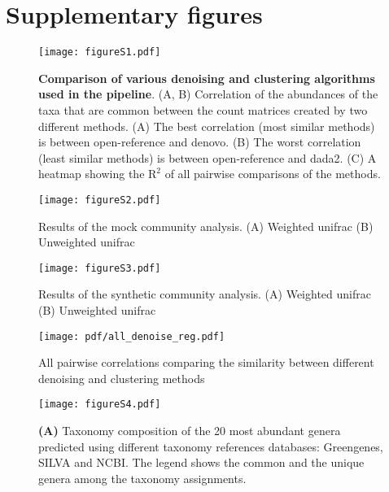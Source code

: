 
\newpage
\section*{Supplementary figures}

  \renewcommand{\thefigure}{S\arabic{figure}}
  \setcounter{figure}{0}

  \begin{figure}[h]
  \centering
  \texttt{[image: figureS1.pdf]}
  \caption{
    \textbf{Comparison of various denoising and clustering algorithms used in the pipeline}.
    (A, B) Correlation of the abundances of the taxa that are common between the count matrices created by two different methods.
    (A) The best correlation (most similar methods) is between open-reference and denovo.
    (B) The worst correlation (least similar methods) is between open-reference and dada2.
    (C) A heatmap showing the $\mathrm{R}^2$ of all pairwise comparisons of the methods.
  }
  \label{fig:figureS1}
\end{figure}

  \begin{figure}[h]
    \centering
    \texttt{[image: figureS2.pdf]}
    \caption{Results of the mock community analysis. (A) Weighted unifrac (B) Unweighted unifrac}
    \label{fig:figureS2}
  \end{figure}

  \begin{figure}[h]
    \centering
    \texttt{[image: figureS3.pdf]}
    \caption{Results of the synthetic community analysis. (A) Weighted unifrac (B) Unweighted unifrac}
    \label{fig:figureS3}
  \end{figure}

  \begin{figure}[h]
    \centering
    \texttt{[image: pdf/all\_denoise\_reg.pdf]}
    \caption{All pairwise correlations comparing the similarity between different denoising and clustering methods}
    \label{fig:figureS4}
  \end{figure}

  \begin{figure}[h]
    \centering
    \texttt{[image: figureS4.pdf]}
    \caption{
      \textbf{(A)} Taxonomy composition of the 20 most abundant genera predicted using different taxonomy references databases: Greengenes, SILVA and NCBI.
      The legend shows the common and the unique genera among the taxonomy assignments.
  }
    \label{fig:figureS4}
  \end{figure}

